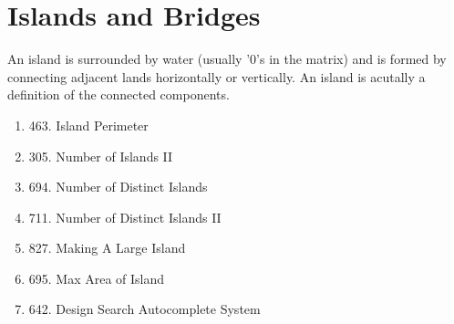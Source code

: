 \documentclass[../main.tex]{subfiles}
\begin{document}
\section{Islands and Bridges}
An island is surrounded by water (usually '0's in the matrix) and is formed by connecting adjacent lands horizontally or vertically. An island is acutally a definition of the connected components. 
\begin{enumerate}
    \item 463. Island Perimeter 
    \item 305. Number of Islands II
    \item 694. Number of Distinct Islands
    \item 711. Number of Distinct Islands II \item 827. Making A Large Island  
    \item 695. Max Area of Island 
    \item 642. Design Search Autocomplete System  
\end{enumerate}
\end{document}
